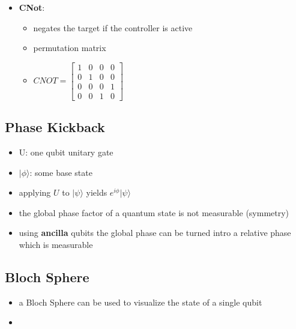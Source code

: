 \documentclass[12pt,a4paper]{article}
\newcommand{\ket}[1]{\vert #1 \rangle}
\begin{document}
\begin{itemize}
\item \textbf{CNot}:
\begin{itemize}
\item negates the target if the controller is active
\item permutation matrix
\item $CNOT = \begin{bmatrix}1 & 0 & 0 & 0\\0 & 1 & 0 & 0\\0 & 0 & 0 & 1\\0 & 0 & 1 & 0 \end{bmatrix}$
\end{itemize} 
\end{itemize}

\subsection{Phase Kickback}
\begin{itemize}
\item U: one qubit unitary gate 
\item $\ket{\phi}$: some base state 
\item applying $U$ to $\ket{\psi}$ yields $e^{i\phi}\ket{\psi}$
\item the global phase factor of a quantum state is not measurable (symmetry)
\item using \textbf{ancilla} qubits the global phase can be turned intro a relative phase which is measurable
\end{itemize}

\subsection{Bloch Sphere}
\begin{itemize}
\item a Bloch Sphere can be used to visualize the state of a single qubit
\item {}
\end{itemize}
\end{document}
